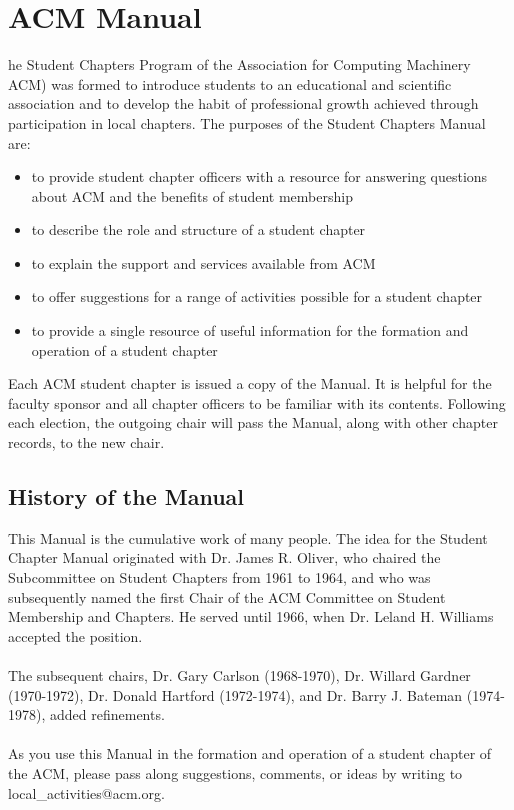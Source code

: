 %
%
\let\textcircled=\pgftextcircled
\chapter{ACM Manual}
\label{chap:manual}

he Student Chapters Program of the Association for Computing Machinery
ACM) was formed to introduce students to an educational and scientific association
and to develop the habit of professional growth achieved through participation
in local chapters. The purposes of the Student Chapters Manual are:
	\begin{itemize}
		\item to provide student chapter officers with a resource for answering
					questions about ACM and the benefits of student membership
		\item to describe the role and structure of a student chapter
		\item to explain the support and services available from ACM
		\item to offer suggestions for a range of activities possible for a student
					chapter
		\item to provide a single resource of useful information for the formation
					and operation of a student chapter
	\end{itemize}

Each ACM student chapter is issued a copy of the Manual. It is helpful for the
faculty sponsor and all chapter officers to be familiar with its contents.
Following each election, the outgoing chair will pass the Manual, along with
other chapter records, to the new chair.

\section{History of the Manual}
\label{sec:sec01}

This Manual is the cumulative work of many people. The idea for the Student
Chapter Manual originated with Dr. James R. Oliver, who chaired the Subcommittee
on Student Chapters from 1961 to 1964, and who was subsequently named the first
Chair of the ACM Committee on Student Membership and Chapters. He served until
1966, when Dr. Leland H. Williams accepted the position.
\\
\\
The subsequent chairs, Dr. Gary Carlson (1968-1970), Dr. Willard Gardner
(1970-1972), Dr. Donald Hartford (1972-1974), and Dr. Barry J. Bateman
(1974-1978), added refinements.
\\
\\
As you use this Manual in the formation and operation of a student chapter of
the ACM, please pass along suggestions, comments, or ideas by writing to
local\_activities@acm.org.

